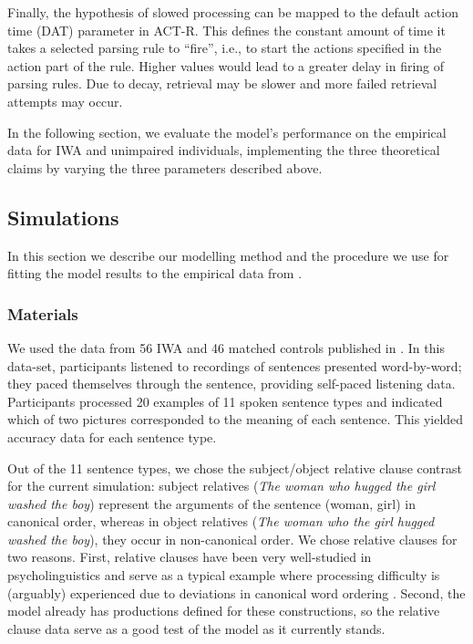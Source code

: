 \documentclass{cambridge7A}\usepackage[]{graphicx}\usepackage[]{color}
\begin{document}
Finally, the hypothesis of slowed processing can be mapped to the default action time (DAT) parameter in ACT-R. This defines the constant amount of time it takes a selected parsing rule to ``fire'', i.e., to start the actions specified in the action part of the rule. Higher values would lead to a greater delay in firing of parsing rules. Due to decay, retrieval may be slower and more failed retrieval attempts may occur. 

In the following section, we evaluate the model's performance on the empirical data for IWA and unimpaired individuals, implementing the three theoretical claims by varying the three parameters described above. 

\subsection{Simulations}

In this section we describe our modelling method and the procedure we use for fitting the model results to the empirical data from \cite{CaplanEtAl2015}.

\subsubsection{Materials} \label{caplanmaterials}

We used the data from 56 IWA and 46 matched controls published in \cite{CaplanEtAl2015}. In this data-set, participants listened to recordings of sentences presented word-by-word; they paced themselves through the sentence, providing self-paced listening data. Participants processed 20 examples of 11 spoken sentence types and indicated which of two pictures corresponded to the meaning of each sentence. This yielded accuracy data for each sentence type. 

Out of the 11 sentence types, we chose the subject/object relative clause contrast for the current simulation:
subject relatives (\textit{The woman who hugged the girl washed the boy}) represent the arguments of the sentence (woman, girl) in canonical order, whereas in object relatives (\textit{The woman who the girl hugged washed the boy}), they occur in non-canonical order.
We chose relative clauses for two reasons. First, relative clauses have been very well-studied in psycholinguistics and serve as a typical example where processing difficulty is (arguably) experienced due to deviations in canonical word ordering \citep{JustCarpenter1992}.
Second, the \cite{LewisVasishth2005} model already has productions defined for these constructions, so the relative clause data serve as a good test of the model as it currently stands.
\end{document}
